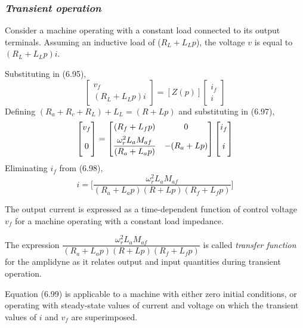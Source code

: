 \documentclass[a4paper,numbers=noenddot,12pt]{scrbook}
\begin{document}
\subsubsection{\textit{Transient operation}}
Consider a machine operating with a constant load connected to its output terminals. Assuming an inductive load of ($R_L + L_L p$), the voltage $v$ is equal to $(R_L + L_L p)i$.

Substituting in (6.95),
\begin{equation}
    \begin{bmatrix}
        v_f \\ (R_L + L_L p)i
    \end{bmatrix}
    =
    [Z(p)]
    \begin{bmatrix}
        i_f \\ i
    \end{bmatrix}
    \label{eq:Eq6.97}
\end{equation}
Defining $(R_a + R_c + R_L) + L_L = (R + Lp)$ and substituting in (6.97),
\begin{equation}
    \begin{bmatrix}
        v_f \\[1ex] 0 \vphantom{\dfrac{M^2}{R_a}}
    \end{bmatrix}
    =
    \begin{bmatrix}
        (R_f + L_f p) & 0 \\[1ex]
        \dfrac{\omega_r^2 L_a M_{af}}{(R_a + L_a p)} & -(R_a + Lp)
    \end{bmatrix}
    \begin{bmatrix}
        i_f \\[1ex] i\vphantom{\dfrac{M^2}{R_a}}
    \end{bmatrix}
    \label{eq:Eq6.98}
\end{equation}
Eliminating $i_f$ from (6.98),
\begin{equation}
    i = \bigg[ \dfrac{\omega_r^2 L_a M_{af}}{(R_a + L_a p)(R + Lp)(R_f + L_f p)}\bigg] 
    \label{eq:Eq6.99}
\end{equation}

The output current is expressed as a time-dependent function of control voltage $v_f$ for a machine operating with a constant load impedance.

The expression $\dfrac{\omega_r^2 L_a M_{af}}{(R_a + L_a p)(R + L p)(R_f + L_f p)}$ is called \textit{transfer function} for the amplidyne as it relates output and input quantities during transient operation.

Equation (6.99) is applicable to a machine with either zero initial conditions, or operating with steady-state values of current and voltage on which the transient values of $i$ and $v_f$ are superimposed.
\end{document}
